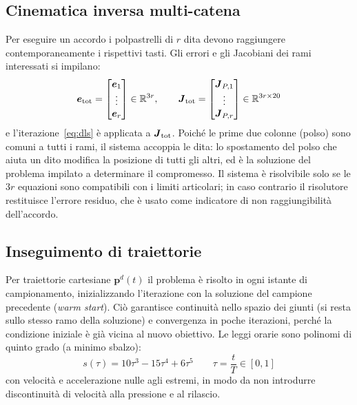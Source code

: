 \subsection{Cinematica inversa multi-catena}

Per eseguire un accordo i polpastrelli di $r$ dita devono raggiungere contemporaneamente i rispettivi tasti. Gli errori e gli Jacobiani dei rami interessati si impilano:
\begin{equation}
    \boldsymbol e_{\rm tot}=\begin{bmatrix}\boldsymbol e_1\\ \vdots\\ \boldsymbol e_r\end{bmatrix}\in\mathbb R^{3r},
    \qquad
    \boldsymbol J_{\rm tot}=\begin{bmatrix}\boldsymbol J_{P,1}\\ \vdots\\ \boldsymbol J_{P,r}\end{bmatrix}\in\mathbb R^{3r\times 20}
\end{equation}
e l'iterazione~\eqref{eq:dls} è applicata a $\boldsymbol J_{\rm tot}$. Poiché le prime due colonne (polso) sono comuni a tutti i rami, il sistema accoppia le dita: lo spostamento del polso che aiuta un dito modifica la posizione di tutti gli altri, ed è la soluzione del problema impilato a determinare il compromesso. Il sistema è risolvibile solo se le $3r$ equazioni sono compatibili con i limiti articolari; in caso contrario il risolutore restituisce l'errore residuo, che è usato come indicatore di non raggiungibilità dell'accordo.

\subsection{Inseguimento di traiettorie}

Per traiettorie cartesiane $\boldsymbol p^d(t)$ il problema è risolto in ogni istante di campionamento, inizializzando l'iterazione con la soluzione del campione precedente (\textit{warm start}). Ciò garantisce continuità nello spazio dei giunti (si resta sullo stesso ramo della soluzione) e convergenza in poche iterazioni, perché la condizione iniziale è già vicina al nuovo obiettivo. Le leggi orarie sono polinomi di quinto grado (a minimo sbalzo):
\begin{equation}
    s(\tau)=10\tau^3-15\tau^4+6\tau^5
    \qquad \tau = \frac{t}{T} \in [0,1]
\end{equation}
con velocità e accelerazione nulle agli estremi, in modo da non introdurre discontinuità di velocità alla pressione e al rilascio.

